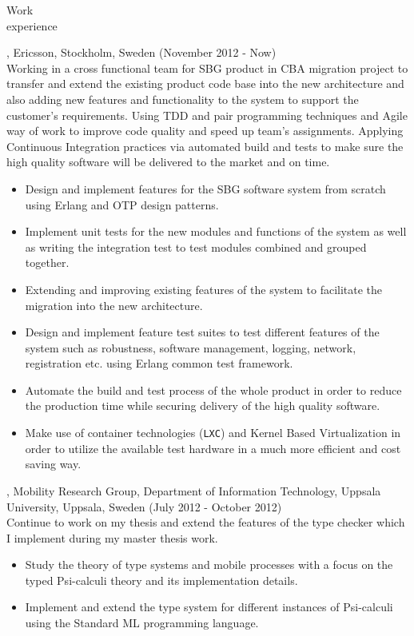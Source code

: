 \documentclass{resume}
\begin{document}
\begin{category}{Work \\experience}

, Ericsson, Stockholm, Sweden (November 2012 - Now)\\
Working in a cross functional team for SBG product in CBA migration project to 
transfer and extend the existing product code base into the new architecture and also 
adding new features and functionality to the system to support the customer's requirements.
Using TDD and pair programming techniques and Agile way of work to improve code quality and
speed up team's assignments. Applying Continuous Integration practices via automated build and tests to 
make sure the high quality software will be delivered to the market and on time.
\begin{itemize}
 \item Design and implement features for the SBG software system from scratch using 
       Erlang and OTP design patterns.
 \item Implement unit tests for the new modules and functions of the system as well as 
       writing the integration test to test modules combined and grouped together. 
 \item Extending and improving existing features of the system to facilitate the 
       migration into the new architecture.
 \item Design and implement feature test suites to test different features of the 
       system such as robustness, software management, logging, network, registration 
       etc. using Erlang common test framework.
 \item Automate the build and test process of the whole product in order to reduce the production time
       while securing delivery of the high quality software.
 \item Make use of container technologies (\texttt{LXC}) and Kernel Based Virtualization in order to utilize the 
       available test hardware in a much more efficient and cost saving way.
\end{itemize}

, Mobility Research Group, Department of Information Technology, 
Uppsala University, Uppsala, Sweden (July 2012 - October 2012)\\
Continue to work on my thesis and extend the features of the type checker which I 
implement during my master thesis work.
\begin{itemize}
 \item Study the theory of type systems and mobile processes with a 
       focus on the typed Psi-calculi theory and its implementation details.
 \item Implement and extend the type system for different instances of Psi-calculi 
       using the Standard ML programming language.
\end{itemize}


\end{category}
\end{document}

